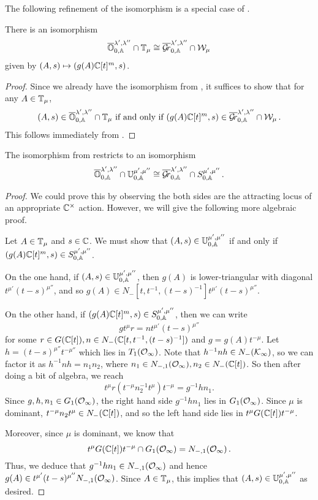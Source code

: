 \documentclass{article}
\begin{document}
The following refinement of the \mvy isomorphism is a special case of \cite[Theorem 5.3]{mirkovic2007quiver}. 
% 
\begin{theorem} 
\label{th:OGrl}
There is an isomorphism
$$
    \overline{\mathbb O}^{\lambda', \lambda''}_{0,\mathbb A} \cap \mathbb T_\mu \cong \overline{\mathcal{G}\!r}^{\lambda', \lambda''}_{0,\mathbb A} \cap \mathcal W_\mu 
$$
given by $ (A,s) \mapsto (g(A)\mathbb C[t]^m, s)$.
\end{theorem}
% 
\begin{proof}
Since we already have the isomorphism from , it suffices to show that for any $ A \in \mathbb T_\mu$, 
$$ 
    (A,s) \in \overline{\mathbb O}^{\lambda', \lambda''}_{0,\mathbb A} \cap \mathbb T_\mu \text{ if and only if } (g(A)\mathbb C[t]^m, s) \in \overline{\mathcal{G}\!r}^{\lambda', \lambda''}_{0,\mathbb A} \cap \mathcal W_\mu \,. 
$$
This follows immediately from .
\end{proof}
% 
\begin{theorem}
\label{th:OTGrW}
The isomorphism from  restricts to an isomorphism
$$ 
    \overline{\mathbb O}^{\lambda', \lambda''}_{0,\mathbb A} \cap \mathbb U^{\mu', \mu''}_{0,\mathbb A} \cong \overline{\mathcal{G}\!r}^{\lambda', \lambda''}_{0,\mathbb A} \cap S^{\mu', \mu''}_{0,\mathbb A}\,.
$$
\end{theorem}
% 
\begin{proof}
We could prove this by observing the both sides are the attracting locus of an appropriate $ {\mathbb C^\times}$ action. However, we will give the following more algebraic proof.

Let $ A \in \mathbb T_\mu$ and $ s \in \mathbb C $. We must show that  $ (A,s) \in \mathbb U^{\mu', \mu''}_{0,\mathbb A} $ if and only if $ (g(A)\mathbb C[t]^m,s) \in S^{\mu', \mu''}_{0,\mathbb A} $. 

On the one hand, if $ (A,s) \in \mathbb U^{\mu', \mu''}_{0,\mathbb A} $, then $ g(A)$ is lower-triangular with diagonal $ t^{\mu'} (t-s)^{\mu''}$, and so $ g(A) \in N_-[t, t^{-1}, (t-s)^{-1}] t^{\mu'} (t-s)^{\mu''}$. 

On the other hand, if $ (g(A)\mathbb C[t]^m, s) \in S^{\mu', \mu''}_{0,\mathbb A}$, then we can write 
$$
    g t^\mu r= n t^{\mu'} (t-s)^{\mu''}
$$
for some $ r \in G(\mathbb C[t]), n \in N_-(\mathbb C[t, t^{-1}, (t-s)^{-1}]) $ and $ g = g(A)t^{-\mu}$.  Let $ h = (t-s)^{\mu''} t^{-\mu''}$ which lies in $ T_1(\mathcal O_\infty) $. 
Note that $ h^{-1}n h \in N_-(\mathcal K_\infty)$, so we can factor it as $ h^{-1} n h  = n_1 n_2 $, where $ n_1 \in N_{-,1}(\mathcal O_\infty), n_2 \in N_-(\mathbb C[t])$.  So then after doing a bit of algebra, we reach
$$
    t^\mu r (t^{-\mu} n_2^{-1} t^\mu) t^{-\mu} = g^{-1} h n_1.
$$
Since $ g, h, n_1 \in G_1(\mathcal O_\infty)$, the right hand side $ g^{-1} h n_1 $ lies in $ G_1(\mathcal O_\infty) $.  Since $ \mu $ is dominant, $ t^{-\mu} n_2 t^\mu \in N_-(\mathbb C[t])$, and so the left hand side lies in $t^\mu G(\mathbb C[t]) t^{-\mu}$.

Moreover, since $ \mu $ is dominant, we know that 
$$
    t^\mu G(\mathbb C[t]) t^{-\mu} \cap G_1(\mathcal O_\infty) = N_{-,1}(\mathcal O_\infty)\,.
$$
Thus, we deduce that $ g^{-1} h n_1 \in N_{-,1}(\mathcal O_\infty)$ and hence $ g(A) \in t^{\mu'} (t-s)^{\mu''}N_{-,1}(\mathcal O_\infty) $. Since $ A \in \mathbb T_\mu $, this implies that $ (A,s) \in \mathbb U^{\mu', \mu''}_{0,\mathbb A}$ as desired.
\end{proof}
\end{document}
